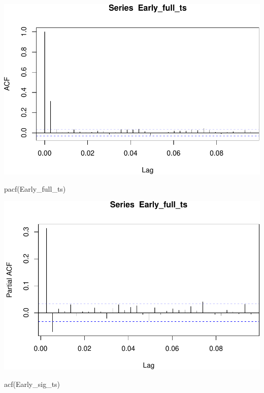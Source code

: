 \documentclass[
  12pt,
]{article}
\newenvironment{Shaded}{\begin{snugshade}}{\end{snugshade}}
\newcommand{\FunctionTok}[1]{\textcolor[rgb]{0.00,0.00,0.00}{#1}}
\newcommand{\NormalTok}[1]{#1}
\begin{document}
\includegraphics{Project_Template_TLK_files/figure-latex/unnamed-chunk-1-5.pdf}

\begin{Shaded}
\begin{Highlighting}[]
\FunctionTok{pacf}\NormalTok{(Early\_full\_ts)}
\end{Highlighting}
\end{Shaded}

\includegraphics{Project_Template_TLK_files/figure-latex/unnamed-chunk-1-6.pdf}

\begin{Shaded}
\begin{Highlighting}[]
\FunctionTok{acf}\NormalTok{(Early\_sig\_ts)}
\end{Highlighting}
\end{Shaded}
\end{document}
